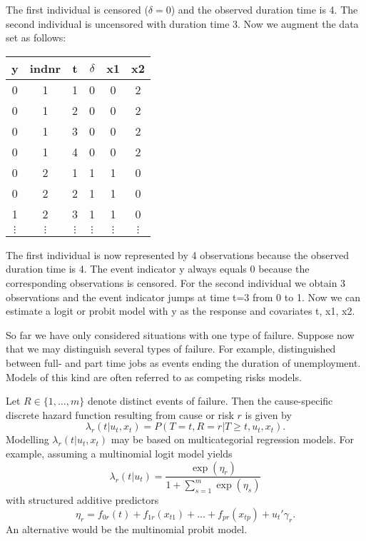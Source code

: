 \documentclass[11pt,a4paper,twoside]{bayesxarticle}
\begin{document}
The first individual is censored ($\delta=0$) and the observed
duration time is 4. The second individual is uncensored with
duration time 3. Now we augment the data set as follows:

\begin{center}
\begin{tabular}{c|c|c|c|c|c}
y & indnr & t &$\delta$ & x1 & x2\\\hline\hline
0 &  1 &   1 & 0  &    0  & 2\\
0 &  1 &   2 & 0  &    0  & 2\\
0 &  1 &   3&  0  &    0 &  2\\
0 &  1  &  4&  0  &    0 &  2\\\hline
0 &  2  &  1 & 1   &   1 &  0\\
0  & 2  &  2 & 1  &    1  & 0\\
1 &  2 &  3 & 1  &  1  & 0\\\hline
 $\vdots$ & $\vdots$ & $\vdots$ & $\vdots$& $\vdots$& $\vdots$
\end{tabular}
\end{center}

The first individual is now represented by 4 observations because
the observed duration time is 4. The event indicator y always equals
0 because the corresponding observations is censored. For the second
individual we obtain 3 observations and the event indicator jumps at
time t=3 from 0 to 1. Now we can estimate a logit or probit model
with y as the response and covariates t, x1, x2.

So far we have only considered situations with one type of failure. Suppose now that we may distinguish several types of
failure. For example,  distinguished between full- and part time jobs as events ending the duration of
unemployment. Models of this kind are often referred to as competing risks models.

Let $R \in \{1,\dots,m\}$ denote distinct events of failure. Then
the cause-specific discrete hazard function resulting from cause or
risk $r$ is given by
$$
\lambda_{r}(t|u_t,x_t) = P(T=t,R=r|T \geq t, u_t,x_t).
$$
Modelling $\lambda_{r}(t|u_t,x_t)$ may be based on multicategorial
regression models. For example, assuming a multinomial logit model
yields
$$
\lambda_{r}(t|u_t) = \frac{\exp(\eta_{r})}{1+\sum_{s=1}^m
\exp(\eta_s)}
$$
with structured additive predictors
\begin{equation}
\label{gampred3} \eta_{r}=f_{0r}(t) +
f_{1r}(x_{t1})+\dots+f_{pr}(x_{tp})+u_{t}'\gamma_r.
\end{equation}
An alternative would be the multinomial probit model.
\end{document}
